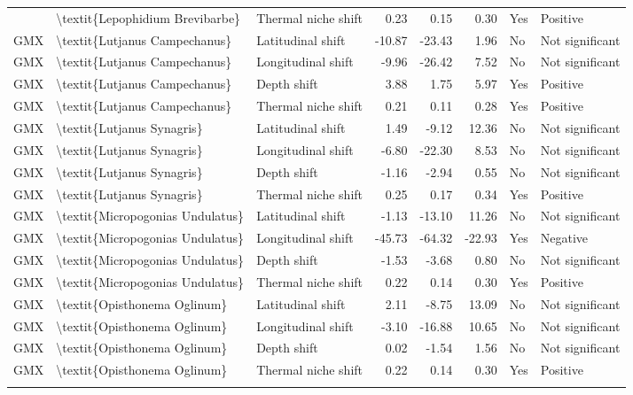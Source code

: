 \begin{longtable}[t]{lllrrrll}
{{GMX & \textbackslash{}textit\{Lepophidium Brevibarbe\} & Thermal niche shift & 0.23 & 0.15 & 0.30 & Yes & Positive\\
GMX & \textbackslash{}textit\{Lutjanus Campechanus\} & Latitudinal shift & -10.87 & -23.43 & 1.96 & No & Not significant\\
GMX & \textbackslash{}textit\{Lutjanus Campechanus\} & Longitudinal shift & -9.96 & -26.42 & 7.52 & No & Not significant\\
GMX & \textbackslash{}textit\{Lutjanus Campechanus\} & Depth shift & 3.88 & 1.75 & 5.97 & Yes & Positive\\
\addlinespace
GMX & \textbackslash{}textit\{Lutjanus Campechanus\} & Thermal niche shift & 0.21 & 0.11 & 0.28 & Yes & Positive\\
GMX & \textbackslash{}textit\{Lutjanus Synagris\} & Latitudinal shift & 1.49 & -9.12 & 12.36 & No & Not significant\\
GMX & \textbackslash{}textit\{Lutjanus Synagris\} & Longitudinal shift & -6.80 & -22.30 & 8.53 & No & Not significant\\
GMX & \textbackslash{}textit\{Lutjanus Synagris\} & Depth shift & -1.16 & -2.94 & 0.55 & No & Not significant\\
GMX & \textbackslash{}textit\{Lutjanus Synagris\} & Thermal niche shift & 0.25 & 0.17 & 0.34 & Yes & Positive\\
\addlinespace
GMX & \textbackslash{}textit\{Micropogonias Undulatus\} & Latitudinal shift & -1.13 & -13.10 & 11.26 & No & Not significant\\
GMX & \textbackslash{}textit\{Micropogonias Undulatus\} & Longitudinal shift & -45.73 & -64.32 & -22.93 & Yes & Negative\\
GMX & \textbackslash{}textit\{Micropogonias Undulatus\} & Depth shift & -1.53 & -3.68 & 0.80 & No & Not significant\\
GMX & \textbackslash{}textit\{Micropogonias Undulatus\} & Thermal niche shift & 0.22 & 0.14 & 0.30 & Yes & Positive\\
GMX & \textbackslash{}textit\{Opisthonema Oglinum\} & Latitudinal shift & 2.11 & -8.75 & 13.09 & No & Not significant\\
\addlinespace
GMX & \textbackslash{}textit\{Opisthonema Oglinum\} & Longitudinal shift & -3.10 & -16.88 & 10.65 & No & Not significant\\
GMX & \textbackslash{}textit\{Opisthonema Oglinum\} & Depth shift & 0.02 & -1.54 & 1.56 & No & Not significant\\
GMX & \textbackslash{}textit\{Opisthonema Oglinum\} & Thermal niche shift & 0.22 & 0.14 & 0.30 & Yes & Positive\\
}}
\end{longtable}
